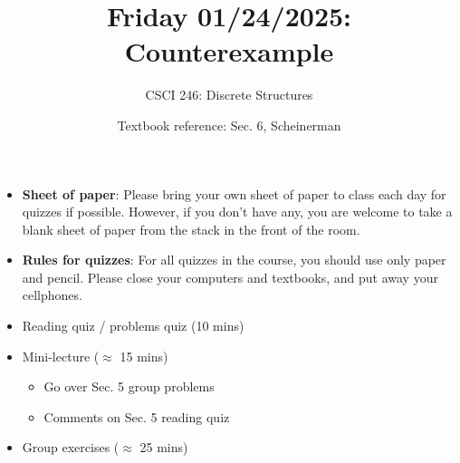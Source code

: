\documentclass[10pt]{beamer}
\begin{document}






\title{Friday 01/24/2025: Counterexample}
\author{CSCI 246: Discrete Structures}
\date{Textbook reference: Sec. 6, Scheinerman}

\begin{frame}
    \titlepage 
\end{frame}


\begin{frame}


\begin{mygreenbox}[title=Quiz Set up]
\begin{itemize}
\item \textbf{Sheet of paper}: Please bring your own sheet of paper to class each day for quizzes if possible. However, if you don't have any, you are welcome to take a blank sheet of paper from the stack in the front of the room.
\item \textbf{Rules for quizzes}: For all quizzes in the course, you should use only paper and pencil.  Please close your computers and textbooks, and put away your cellphones.    
\end{itemize}
\end{mygreenbox}


\begin{myyellowbox}[title=Today's Agenda]
\begin{itemize}
	\item Reading quiz / problems quiz (10 mins)
	\item Mini-lecture ($\approx$ 15 mins)
	\begin{itemize}
	\item Go over Sec. 5 group problems
	\item Comments on Sec. 5 reading quiz
	\end{itemize}
	\item Group exercises ($\approx$ 25 mins)	
\end{itemize}

\end{myyellowbox}



\end{frame}
\end{document}
